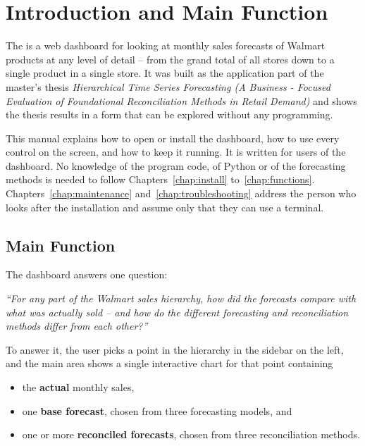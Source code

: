 %
%
%


\chapter{Introduction and Main Function}
\label{chap:intro}

The \emph{\AppName} is a web dashboard for looking at monthly sales forecasts of Walmart products at any level of detail -- from the grand total of all stores down to a single product in a single store. It was built as the application part of the master's thesis \emph{Hierarchical Time Series Forecasting (A Business - Focused Evaluation of Foundational Reconciliation Methods in Retail Demand)} and shows the thesis results in a form that can be explored without any programming.

This manual explains how to open or install the dashboard, how to use every control on the screen, and how to keep it running. It is written for users of the dashboard. No knowledge of the program code, of Python or of the forecasting methods is needed to follow Chapters~\ref{chap:install} to~\ref{chap:functions}. Chapters~\ref{chap:maintenance} and~\ref{chap:troubleshooting} address the person who looks after the installation and assume only that they can use a terminal.

\section{Main Function}
\label{sec:mainFunction}

The dashboard answers one question:

\begin{center}
\begin{minipage}{0.85\linewidth}
\itshape
``For any part of the Walmart sales hierarchy, how did the forecasts compare with what was actually sold -- and how do the different forecasting and reconciliation methods differ from each other?''
\end{minipage}
\end{center}

To answer it, the user picks a point in the hierarchy in the sidebar on the left, and the main area shows a single interactive chart for that point containing
\begin{itemize}
  \item the \textbf{actual} monthly sales,
  \item one \textbf{base forecast}, chosen from three forecasting models, and
  \item one or more \textbf{reconciled forecasts}, chosen from three reconciliation methods.
\end{itemize}

